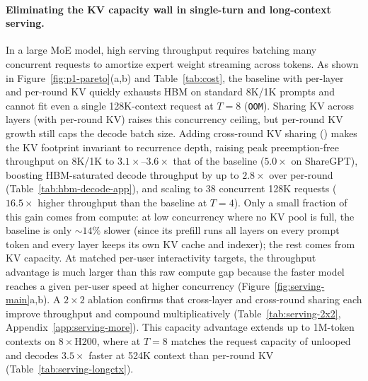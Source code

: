 \paragraph{Eliminating the KV capacity wall in single-turn and long-context serving.}
In a large MoE model, high serving throughput requires batching many concurrent requests to amortize expert weight streaming across tokens.
As shown in Figure~\ref{fig:p1-pareto}(a,b) and Table~\ref{tab:cost}, the baseline with per-layer and per-round KV quickly exhausts HBM on standard 8K/1K prompts and cannot fit even a single 128K-context request at $T=8$ (\texttt{OOM}).
Sharing KV across layers (\ced with per-round KV) raises this concurrency ceiling, but per-round KV growth still caps the decode batch size.
Adding cross-round KV sharing (\ourmethod) makes the KV footprint invariant to recurrence depth, raising peak preemption-free throughput on 8K/1K to $\mathbf{3.1\times}$--$\mathbf{3.6\times}$ that of the baseline ($\mathbf{5.0\times}$ on ShareGPT), boosting HBM-saturated decode throughput by up to $\mathbf{2.8\times}$ over per-round \ced (Table~\ref{tab:hbm-decode-app}), and scaling to 38 concurrent 128K requests ($\mathbf{16.5\times}$ higher throughput than the baseline at $T=4$).
Only a small fraction of this gain comes from compute: at low concurrency where no KV pool is full, the baseline is only $\sim\!14\%$ slower (since its prefill runs all layers on every prompt token and every layer keeps its own KV cache and indexer); the rest comes from KV capacity.
At matched per-user interactivity targets, the throughput advantage is much larger than this raw compute gap because the faster model reaches a given per-user speed at higher concurrency (Figure~\ref{fig:serving-main}a,b).
A $2\times 2$ ablation confirms that cross-layer and cross-round sharing each improve throughput and compound multiplicatively (Table~\ref{tab:serving-2x2}, Appendix~\ref{app:serving-more}).
This capacity advantage extends up to 1M-token contexts on $8\times\text{H200}$, where \ourmethod at $T=8$ matches the request capacity of unlooped \ced and decodes $\mathbf{3.5\times}$ faster at 524K context than per-round KV (Table~\ref{tab:serving-longctx}).
